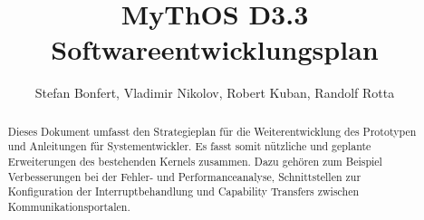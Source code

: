 

\title{MyThOS D3.3 Softwareentwicklungsplan}
\author{Stefan Bonfert, Vladimir Nikolov, Robert Kuban, Randolf Rotta}



\maketitle

\begin{abstract}

Dieses Dokument umfasst den Strategieplan für die Weiterentwicklung des
Prototypen und Anleitungen für Systementwickler.
Es fasst somit nützliche und geplante Erweiterungen des bestehenden
Kernels zusammen. Dazu gehören zum Beispiel Verbesserungen bei der Fehler- und
Performanceanalyse, Schnittstellen zur Konfiguration der Interruptbehandlung und
Capability Transfers zwischen Kommunikationsportalen.
 
\end{abstract}

\newpage
\tableofcontents



